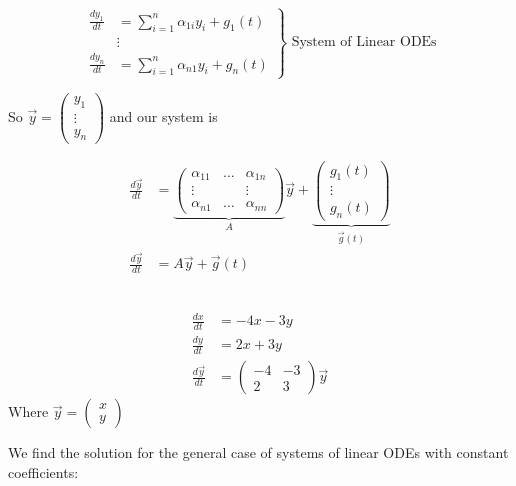 \documentclass[10pt]{scrartcl}
\begin{document}

\[\left.
\begin{aligned}
  \frac{dy_1}{dt} &= \sum_{i=1}^n \alpha_{1i}y_i + g_1(t)\\
  &\vdots\\
  \frac{dy_n}{dt} &= \sum_{i=1}^n \alpha_{n1}y_i + g_n(t)
\end{aligned}\right\}\text{ System of Linear ODEs}
\]

So $\vec{y} = \begin{pmatrix}
 y_1\\ \vdots\\ y_n	
 \end{pmatrix}$ and our system is
 
 \[\begin{aligned}
 \frac{d\vec{y}}{dt} &= \underbrace{\begin{pmatrix}
 \alpha_{11} & \dots & \alpha_{1n}\\
 \vdots & & \vdots\\
 \alpha_{n1} & \dots & \alpha_{nn}	
 \end{pmatrix}}_{A}\vec{y} + 
\underbrace{\begin{pmatrix}
 g_1(t) \\ \vdots \\ g_n(t)	
 \end{pmatrix}}_{\vec{g}(t)}\\
 \frac{d\vec{y}}{dt} &= A\vec{y} + \vec{g}(t)
 \end{aligned}
\]~\vspace*{5pt}

\begin{example}
\[
\begin{aligned}
  \frac{dx}{dt} &= -4x - 3y\\
  \frac{dy}{dt} &= 2x + 3y\\
  \frac{d\vec{y}}{dt} &= \begin{pmatrix}
 -4 & -3 \\ 2 & 3	
 \end{pmatrix}\vec{y}
\end{aligned}
\]
Where $\vec{y} = \begin{pmatrix} x \\ y \end{pmatrix}$
\end{example}


We find the solution for the general case of systems of linear ODEs with constant coefficients:
\end{document}
